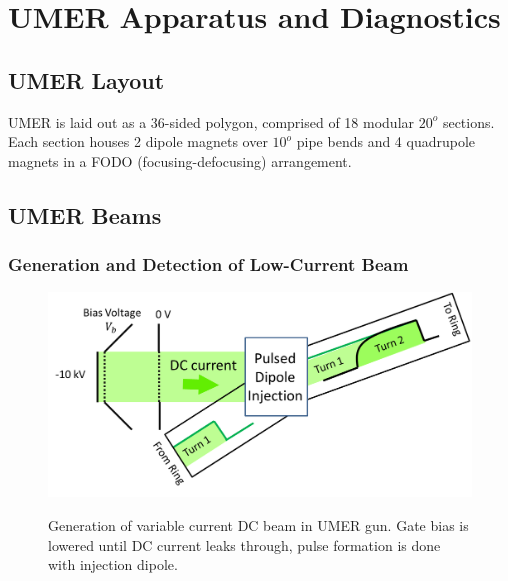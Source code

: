 
\renewcommand{\thechapter}{3}

\chapter{UMER Apparatus and Diagnostics}
\label{ch:apparatus}

\section{UMER Layout}

UMER is laid out as a 36-sided polygon, comprised of 18 modular $20^o$ sections. Each section houses 2 dipole magnets over $10^o$ pipe bends and 4 quadrupole magnets in a FODO (focusing-defocusing) arrangement.

\section{UMER Beams}


	\subsection{Generation and Detection of Low-Current Beam}
	

\begin{figure}
\begin{center}
\includegraphics[width=\textwidth]{3.figures/DCbeam.png}
\end{center}
\renewcommand{\baselinestretch}{1}
\small\normalsize
\begin{quote}
\caption[]{Generation of variable current DC beam in UMER gun. Gate bias is lowered until DC current leaks through, pulse formation is done with injection dipole.}
\label{fig:DCbeamcartoon}
\end{quote}
\end{figure} 
\renewcommand{\baselinestretch}{2}
\small\normalsize
	
